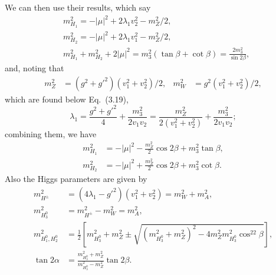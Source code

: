 \documentclass[a4paper,11pt,captions=tableheading,DIV=12]{scrartcl}
\begin{document}
We can then use their results, which say
\begin{align}
 &m_{H_1}^2 = -|\mu|^2 + 2\lambda_1 v_2^2 - m_Z^2/2,
\tag{GH:3.21c}
\\
 &m_{H_2}^2 = -|\mu|^2 + 2\lambda_1 v_1^2 - m_Z^2/2,
\tag{GH:3.21d}
\\
 &m_{H_1}^2 + m_{H_2}^2 + 2|\mu|^2 
= m_{3}^2(\tan\beta+\cot\beta)
= \frac{2m_{3}^2}{\sin2\beta},
\tag{GH:3.22}
\end{align}
and, noting that
\begin{align}
 m_Z^2&=(g^2+g'^2)(v_1^2+v_2^2)/2,&
 m_W^2&=g^2(v_1^2+v_2^2)/2,
\end{align}
which are found below Eq.~(3.19),
\begin{equation}
 \lambda_1
= \frac{g^2+g'^2}{4} + \frac{m_3^2}{2v_1v_2}
= \frac{m_Z^2}{2(v_1^2+v_2^2)} + \frac{m_3^2}{2v_1v_2};
\end{equation}
combining them, we have
\begin{align}
 m_{H_1}^2&=-|\mu|^2-\frac{m_Z^2}{2}\cos2\beta + m_3^2\tan\beta,\\
 m_{H_2}^2&=-|\mu|^2+\frac{m_Z^2}{2}\cos2\beta + m_3^2\cot\beta.
\end{align}
Also the Higgs parameters are given by
\begin{align}
 m_{H^\pm}^2&=(4\lambda_1-g'^2)(v_1^2+v_2^2)=m_W^2+m_A^2,\tag{GH:3.16}\\
 m_{H_3^0}^2&=m_{H^\pm}^2-m_W^2=m_A^2,\tag{GH:3.17}\\
 m_{H_1^0,H_2^0}^2 &=
 \frac12\left[m_{H_3^0}^2+m_Z^2\pm\sqrt{
 (m_{H_3^0}^2+m_Z^2)^2-4m_Z^2 m_{H_3^0}^2\cos^22\beta
}\right],\tag{GH:3.18}\\
\tan2\alpha&=\frac{m^2_{H_3^0}+m_Z^2}{m_{H_3^0}^2-m_Z^2}\tan2\beta\tag{GH:3.19}.
\end{align}
\end{document}
